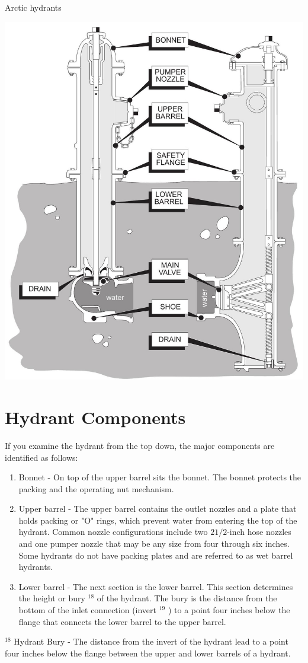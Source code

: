 \documentclass[10pt]{article}
\begin{document}
Arctic hydrants

\includegraphics[max width=\textwidth]{2022_11_03_fc0cbc2f3612fab6edd2g-23}

\section{Hydrant Components}
If you examine the hydrant from the top down, the major components are identified as follows:

\begin{enumerate}
  \item Bonnet - On top of the upper barrel sits the bonnet. The bonnet protects the packing and the operating nut mechanism.

  \item Upper barrel - The upper barrel contains the outlet nozzles and a plate that holds packing or "O" rings, which prevent water from entering the top of the hydrant. Common nozzle configurations include two $21 / 2$-inch hose nozzles and one pumper nozzle that may be any size from four through six inches. Some hydrants do not have packing plates and are referred to as wet barrel hydrants.

  \item Lower barrel - The next section is the lower barrel. This section determines the height or bury ${ }^{18}$ of the hydrant. The bury is the distance from the bottom of the inlet connection (invert ${ }^{19}$ ) to a point four inches below the flange that connects the lower barrel to the upper barrel.

\end{enumerate}
${ }^{18}$ Hydrant Bury - The distance from the invert of the hydrant lead to a point four inches below the flange between the upper and lower barrels of a hydrant.
\end{document}
